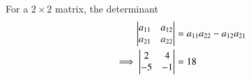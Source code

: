 For a $2\times2$ matrix, the determinant
\begin{align}
\begin{vmatrix}
a_{11}&a_{12}\\a_{21}&a_{22}
\end{vmatrix}
&= a_{11}a_{22}-a_{12}a_{21}
\\
\implies 
\begin{vmatrix}
2&4\\-5&-1
\end{vmatrix} &= 18
\end{align}

